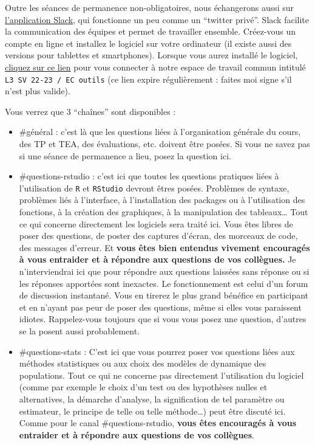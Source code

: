 \documentclass[
  a4paper,
  DIV=11,
  numbers=noendperiod,
  oneside]{scrreprt}
\providecommand{\tightlist}{%
  \setlength{\itemsep}{0pt}\setlength{\parskip}{0pt}}\usepackage{longtable,booktabs,array}
\begin{document}
Outre les séances de permanence non-obligatoires, nous échangerons aussi
sur \href{https://slack.com/intl/fr-fr/}{l'application Slack}, qui
fonctionne un peu comme un ``twitter privé''. Slack facilite la
communication des équipes et permet de travailler ensemble. Créez-vous
un compte en ligne et installez le logiciel sur votre ordinateur (il
existe aussi des versions pour tablettes et smartphones). Lorsque vous
aurez installé le logiciel,
\href{https://join.slack.com/t/l3sv22-23ecoutil/shared_invite/zt-1hmldkjae-Y9VADlxH~iM5u3PPMUF9_A}{cliquez
sur ce lien} pour vous connecter à notre espace de travail commun
intitulé \texttt{L3\ SV\ 22-23\ /\ EC\ outils} (ce lien expire
régulièrement : faites moi signe s'il n'est plus valide).

Vous verrez que 3 ``chaînes'' sont disponibles :

\begin{itemize}
\tightlist
\item
  \#général : c'est là que les questions liées à l'organisation générale
  du cours, des TP et TEA, des évaluations, etc. doivent être posées. Si
  vous ne savez pas si une séance de permanence a lieu, posez la
  question ici.
\item
  \#questions-rstudio : c'est ici que toutes les questions pratiques
  liées à l'utilisation de \texttt{R} et \texttt{RStudio} devront êtres
  posées. Problèmes de syntaxe, problèmes liés à l'interface, à
  l'installation des packages ou à l'utilisation des fonctions, à la
  création des graphiques, à la manipulation des tableaux\ldots{} Tout
  ce qui concerne directement les logiciels sera traité ici. Vous êtes
  libres de poser des questions, de poster des captures d'écran, des
  morceaux de code, des messages d'erreur. Et \textbf{vous êtes bien
  entendus vivement encouragés à vous entraider et à répondre aux
  questions de vos collègues.} Je n'interviendrai ici que pour répondre
  aux questions laissées sans réponse ou si les réponses apportées sont
  inexactes. Le fonctionnement est celui d'un forum de discussion
  instantané. Vous en tirerez le plus grand bénéfice en participant et
  en n'ayant pas peur de poser des questions, même si elles vous
  paraissent idiotes. Rappelez-vous toujours que si vous vous posez une
  question, d'autres se la posent aussi probablement.
\item
  \#questions-stats : C'est ici que vous pourrez poser vos questions
  liées aux méthodes statistiques ou aux choix des modèles de dynamique
  des populations. Tout ce qui ne concerne pas directement l'utilisation
  du logiciel (comme par exemple le choix d'un test ou des hypothèses
  nulles et alternatives, la démarche d'analyse, la signification de tel
  paramètre ou estimateur, le principe de telle ou telle méthode\ldots)
  peut être discuté ici. Comme pour le canal \#questions-rstudio,
  \textbf{vous êtes encouragés à vous entraider et à répondre aux
  questions de vos collègues}.
\end{itemize}
\end{document}
